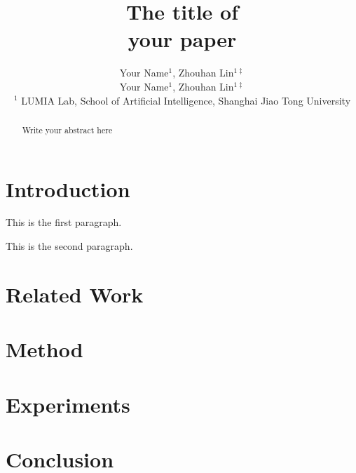 \documentclass[11pt, a4paper]{lumia}
\title{The title of \\ your paper}
\author{%
  Your Name$^{1}$, Zhouhan Lin$^{1\ddagger}$\\
  \Authfont Your Name$^{1}$, Zhouhan Lin$^{1\ddagger}$\\
  $^1$ LUMIA Lab, School of Artificial Intelligence, Shanghai Jiao Tong University
}
\begin{document}
\begin{abstract}
Write your abstract here
\end{abstract}

\maketitle


\newpage
\section{Introduction}
This is the first paragraph.

This is the second paragraph.

\section{Related Work}

\section{Method}

\section{Experiments}

\section{Conclusion}

% 
\end{document}

